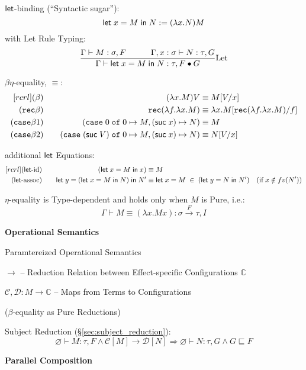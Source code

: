 $\mathsf{let}$-binding (``Syntactic sugar''):
\[
  \mathsf{let}\; x = M \;\mathsf{in}\; N := (\lambda x.N) M
\]
with Let Rule Typing:
\[
  \frac{\Gamma \vdash M:\sigma,F \quad\quad\quad
    \Gamma,x:\sigma \vdash N:\tau,G}
  {\Gamma \vdash \mathsf{let}\; x = M \;\mathsf{in}\; N:\tau, F \bullet G}
  \mathrm{Let}
\]

$\beta\eta$-equality, $\equiv$:
\[
\begin{aligned}[r c r l]
  (\beta) & \quad & (\lambda x.M) V
    & \equiv M[V/x] \\
  (\rec\beta) & \quad & \rec(\lambda f.\lambda x.M)
    & \equiv \lambda x.M[\rec(\lambda f.\lambda x.M)/f] \\
  (\case\beta1) & \quad & (\case\; 0 \;\of\; 0 \mapsto M,
    (\suc\; x) \mapsto N) & \equiv M \\
  (\case\beta2) & \quad & (\case\; (\suc\; V) \;\of\; 0 \mapsto M,
    (\suc\; x) \mapsto N) & \equiv N[V/x] \\
\end{aligned}
\]

additional $\mathsf{let}$ Equations:
\[
\begin{aligned}[r c r l]
  (\lett\text{-id}) & \quad & (\lett\; x = M \;\inn\; x)
    & \equiv M \\
  (\lett\text{-assoc}) & \quad & \lett\; y =
      (\lett\; x = M \;\inn\; N) \;\inn\; N'
    & \equiv \lett\; x = M \;\in\; (\lett\; y = N \;\inn\; N')
      \quad (\text{if}\; x \notin fv(N'))\\
\end{aligned}
\]


$\eta$-equality is Type-dependent and holds only when $M$ is Pure,
i.e.:
\[
  \Gamma \vdash M \equiv (\lambda x.M x):\sigma \xrightarrow{F} \tau,I
\]


\textbf{Operational Semantics}

Paramtereized Operational Semantics

$\rightarrow$ -- Reduction Relation between Effect-specific
Configurations $\mathbb{C}$

$\mathcal{C},\mathcal{D} : M \rightarrow \mathbb{C}$ -- Maps from
Terms to Configurations

($\beta$-equality as Pure Reductions) %

Subject Reduction (\S\ref{sec:subject_reduction}):
\[
  \varnothing \vdash M:\tau,F \wedge \mathcal{C}[M]
    \rightarrow \mathcal{D}[N]
  \Rightarrow \varnothing \vdash N:\tau,G \wedge G \sqsubseteq F
\]


\textbf{Parallel Composition}

